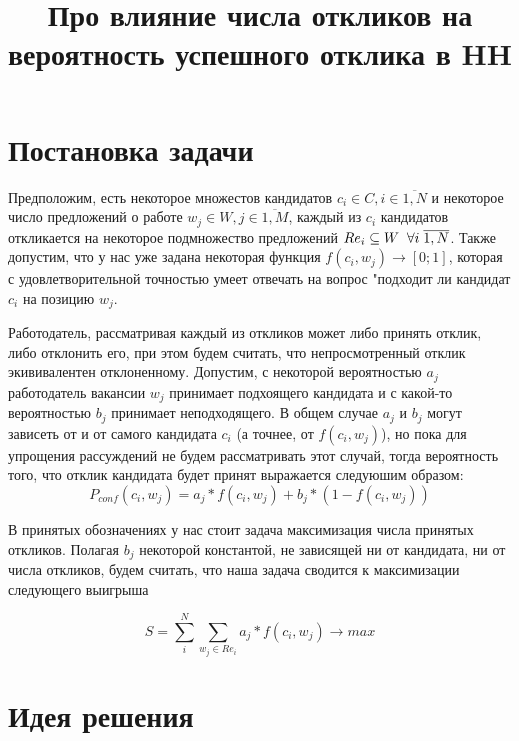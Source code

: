 \documentclass[twocolumn]{article}
\title{Про влияние числа откликов на вероятность успешного отклика в HH}
\begin{document}
    \date{}
    \maketitle

    \section{Постановка задачи}

    Предположим, есть некоторое множестов кандидатов ${c_i} \in C, i \in \overline{1, N}$ и некоторое число предложений о работе ${w_j} \in W, j \in \overline{1, M}$, каждый из $c_i$ кандидатов откликается на некоторое подмножество предложений ${Re_{i}} \subseteq W \hspace{2mm}  \forall{i} \hspace{1mm} \overline{1, N}$. Также допустим, что у нас уже задана некоторая функция $f(c_i, w_j) \xrightarrow{} [0;1]$, которая с удовлетворительной точностью умеет отвечать на вопрос "подходит ли кандидат $c_i$ на позицию $w_j$.

    Работодатель, рассматривая каждый из откликов может либо принять отклик, либо отклонить его, при этом будем считать, что непросмотренный отклик экививалентен отклоненному. Допустим, с некоторой вероятностью $a_{j}$ работодатель вакансии ${w_j}$ принимает подхоящего кандидата и с какой-то вероятностью $b_{j}$ принимает неподходящего. В общем случае $a_{j}$ и $b_{j}$ могут зависеть от и от самого кандидата ${c_i}$ (а точнее, от $f(c_i, w_j)$), но пока для упрощения рассуждений не будем рассматривать этот случай, тогда вероятность того, что отклик кандидата будет принят выражается следуюшим образом:
    \begin{equation}
        \label{P_def}
        P_{conf}(c_i, w_j) = a_{j} * f(c_i, w_j) + b_{j} * (1 - f(c_i, w_j))
    \end{equation}

    В принятых обозначениях у нас стоит задача максимизация числа принятых откликов. Полагая $b_{j}$ некоторой константой, не зависящей ни от кандидата, ни от числа откликов, будем считать, что наша задача сводится к максимизации следующего выигрыша

    $$
    S = \sum_{i}^{N}\sum_{w_j \in Re_{i}} a_{j}  * f(c_i, w_j) \xrightarrow{} max
    $$

    \section{Идея решения}
\end{document}
